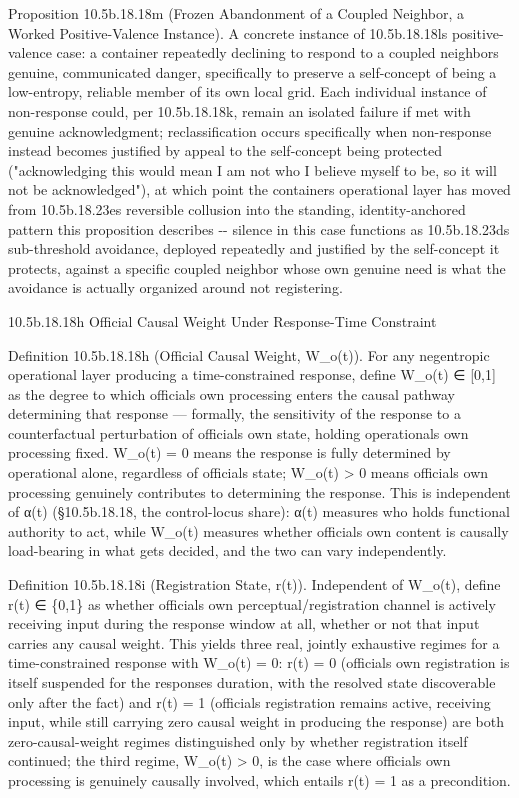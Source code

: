 \documentclass[
]{article}
\begin{document}
Proposition 10.5b.18.18m (Frozen Abandonment of a Coupled Neighbor, a
Worked Positive-Valence Instance). A concrete instance of 10.5b.18.18ls
positive-valence case: a container repeatedly declining to respond to a
coupled neighbors genuine, communicated danger, specifically to preserve
a self-concept of being a low-entropy, reliable member of its own local
grid. Each individual instance of non-response could, per 10.5b.18.18k,
remain an isolated failure if met with genuine acknowledgment;
reclassification occurs specifically when non-response instead becomes
justified by appeal to the self-concept being protected ("acknowledging
this would mean I am not who I believe myself to be, so it will not be
acknowledged"), at which point the containers operational layer has
moved from 10.5b.18.23es reversible collusion into the standing,
identity-anchored pattern this proposition describes -\/- silence in
this case functions as 10.5b.18.23ds sub-threshold avoidance, deployed
repeatedly and justified by the self-concept it protects, against a
specific coupled neighbor whose own genuine need is what the avoidance
is actually organized around not registering.

10.5b.18.18h Official Causal Weight Under Response-Time Constraint

Definition 10.5b.18.18h (Official Causal Weight, W\_o(t)). For any
negentropic operational layer producing a time-constrained response,
define W\_o(t) ∈ {[}0,1{]} as the degree to which officials own
processing enters the causal pathway determining that response ---
formally, the sensitivity of the response to a counterfactual
perturbation of officials own state, holding operationals own processing
fixed. W\_o(t) = 0 means the response is fully determined by operational
alone, regardless of officials state; W\_o(t) \textgreater{} 0 means
officials own processing genuinely contributes to determining the
response. This is independent of α(t) (§10.5b.18.18, the control-locus
share): α(t) measures who holds functional authority to act, while
W\_o(t) measures whether officials own content is causally load-bearing
in what gets decided, and the two can vary independently.

Definition 10.5b.18.18i (Registration State, r(t)). Independent of
W\_o(t), define r(t) ∈ \{0,1\} as whether officials own
perceptual/registration channel is actively receiving input during the
response window at all, whether or not that input carries any causal
weight. This yields three real, jointly exhaustive regimes for a
time-constrained response with W\_o(t) = 0: r(t) = 0 (officials own
registration is itself suspended for the responses duration, with the
resolved state discoverable only after the fact) and r(t) = 1 (officials
registration remains active, receiving input, while still carrying zero
causal weight in producing the response) are both zero-causal-weight
regimes distinguished only by whether registration itself continued; the
third regime, W\_o(t) \textgreater{} 0, is the case where officials own
processing is genuinely causally involved, which entails r(t) = 1 as a
precondition.
\end{document}
